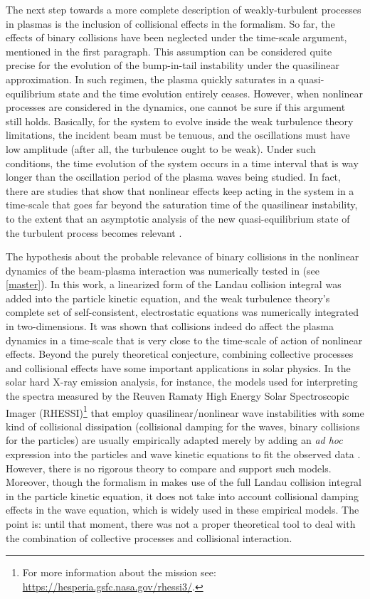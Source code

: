 \documentclass[12pt,a4paper,ruledheader]{report}
\begin{document}
The next step towards a more complete description of weakly-turbulent
processes in plasmas is the inclusion of collisional effects in the
formalism. So far, the effects of binary collisions have been neglected
under the time-scale argument, mentioned in the first paragraph. This
assumption can be considered quite precise for the evolution of the
bump-in-tail instability under the quasilinear approximation. In such
regimen, the plasma quickly saturates in a quasi-equilibrium state and
the time evolution entirely ceases. However, when nonlinear processes
are considered in the dynamics, one cannot be sure if this argument
still holds. Basically, for the system to evolve inside the weak
turbulence theory limitations, the incident beam must be tenuous, and
the oscillations must have low amplitude (after all, the turbulence
ought to be weak). Under such conditions, the time evolution of the
system occurs in a time interval that is way longer than the oscillation
period of the plasma waves being studied. In fact, there are studies that
show that nonlinear effects keep acting in the system in a time-scale that
goes far beyond the saturation time of the quasilinear instability,
to the extent that an asymptotic analysis of the new quasi-equilibrium
state of the turbulent process becomes relevant \cite{Yoon2012c,ZYGP14a,
  ZYGP14b,ZYSGP14c,ZYPGP15}.

The hypothesis about the probable relevance of binary collisions in the
nonlinear dynamics of the beam-plasma interaction was numerically tested
in \cite{Tigik2016a} (see \autoref{master}). In this work, a linearized
form of the Landau collision integral was added into the particle kinetic
equation, and the weak turbulence theory's complete set of self-consistent,
electrostatic equations was numerically integrated in two-dimensions.
It was shown that collisions indeed do affect the plasma dynamics in a
time-scale that is very close to the time-scale of action of nonlinear
effects. Beyond the purely theoretical conjecture, combining collective
processes and collisional effects have some important applications in
solar physics. In the solar hard X-ray emission analysis, for instance, the
models used for interpreting the spectra measured by the Reuven Ramaty High
Energy Solar Spectroscopic Imager (RHESSI)\footnote{For more information
 about the mission see: \url{https://hesperia.gsfc.nasa.gov/rhessi3/}.}
that employ quasilinear/nonlinear wave instabilities with some kind of
collisional dissipation (collisional damping for the waves, binary
collisions for the particles) are usually empirically adapted merely by
adding an \emph{ad hoc} expression into the particles and wave kinetic
equations to fit the observed data \cite{PK95,Kohl1998,Veronig05,Brown2006,
  Kontar2011,KKDSSK11}. However, there is no rigorous theory to compare
and support such models. Moreover, though the formalism in \cite{Tigik2016a}
makes use of the full Landau collision integral in the particle kinetic
equation, it does not take into account collisional damping effects in the
wave equation, which is widely used in these empirical models. The point
is: until that moment, there was not a proper theoretical tool to deal
with the combination of collective processes and collisional interaction.
\end{document}
